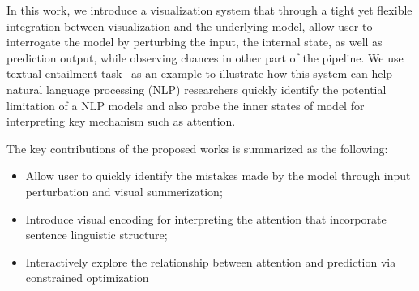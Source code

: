 In this work, we introduce a visualization system that through a tight yet flexible integration between visualization and the underlying model, allow user to interrogate the model by perturbing the input, the internal state, as well as prediction output, while observing chances in other part of the pipeline.
We use textual entailment task~\cite{} as an example to illustrate how this system can help natural language processing (NLP) researchers quickly identify the potential limitation of a NLP models and also probe the inner states of model for interpreting key mechanism such as attention.

%
%


The key contributions of the proposed works is summarized as the following:
\begin{itemize}
    \item Allow user to quickly identify the mistakes made by the model through input perturbation and visual summerization;

    \item Introduce visual encoding for interpreting the attention that incorporate sentence linguistic structure;

    \item Interactively explore the relationship between attention and prediction via constrained optimization
\end{itemize}

%
%

